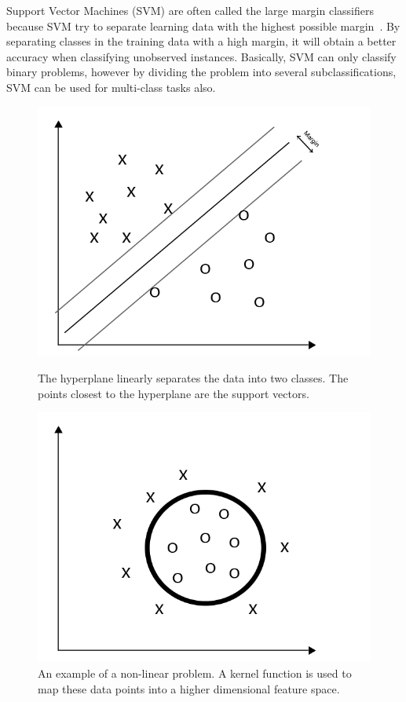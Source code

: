Support Vector Machines (SVM) are often called the large margin classifiers because SVM try to separate learning data with the highest possible margin~\citep{article:fletcher}. By separating classes in the training data with a high margin, it will obtain a better accuracy when classifying unobserved instances. Basically, SVM can only classify binary problems, however by dividing the problem into several subclassifications, SVM can be used for multi-class tasks also.

\begin{figure}[ht]
	\begin{minipage}[b]{0.45\linewidth}
		\centering
		\includegraphics[width=\textwidth]{../img/linear.png}
		\caption{The hyperplane linearly separates the data into two classes. The points closest to the hyperplane are the support vectors.}
		\label{fig:linear}
	\end{minipage}
	\hspace{0.5cm}
	\begin{minipage}[b]{0.45\linewidth}
		\centering
		\includegraphics[width=\textwidth]{../img/non-linear.png}
		\caption{An example of a non-linear problem. A kernel function is used to map these data points into a higher dimensional feature space.}
		\label{fig:non-linear}
	\end{minipage}
\end{figure}

